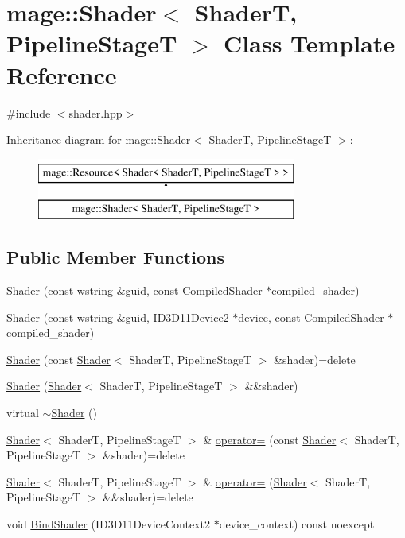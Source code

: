 \hypertarget{classmage_1_1_shader}{}\section{mage\+:\+:Shader$<$ ShaderT, Pipeline\+StageT $>$ Class Template Reference}
\label{classmage_1_1_shader}


{\ttfamily \#include $<$shader.\+hpp$>$}

Inheritance diagram for mage\+:\+:Shader$<$ ShaderT, Pipeline\+StageT $>$\+:\begin{figure}[H]
\begin{center}
\leavevmode
\includegraphics[height=2.000000cm]{classmage_1_1_shader}
\end{center}
\end{figure}
\subsection*{Public Member Functions}
\begin{DoxyCompactItemize}
\item 
\hyperlink{classmage_1_1_shader_a4f02b0d895bd5aafbc72835f0f005c67}{Shader} (const wstring \&guid, const \hyperlink{structmage_1_1_compiled_shader}{Compiled\+Shader} $\ast$compiled\+\_\+shader)
\item 
\hyperlink{classmage_1_1_shader_a5fe620f476f956d5d56e9567493d398a}{Shader} (const wstring \&guid, I\+D3\+D11\+Device2 $\ast$device, const \hyperlink{structmage_1_1_compiled_shader}{Compiled\+Shader} $\ast$compiled\+\_\+shader)
\item 
\hyperlink{classmage_1_1_shader_a512a10b41172e984d8f6983497bcc9e5}{Shader} (const \hyperlink{classmage_1_1_shader}{Shader}$<$ ShaderT, Pipeline\+StageT $>$ \&shader)=delete
\item 
\hyperlink{classmage_1_1_shader_a9d87b88ded8e6874d061cb8c54d6a5e9}{Shader} (\hyperlink{classmage_1_1_shader}{Shader}$<$ ShaderT, Pipeline\+StageT $>$ \&\&shader)
\item 
virtual \hyperlink{classmage_1_1_shader_a10a954f75331d93c9549b2db5a2c838e}{$\sim$\+Shader} ()
\item 
\hyperlink{classmage_1_1_shader}{Shader}$<$ ShaderT, Pipeline\+StageT $>$ \& \hyperlink{classmage_1_1_shader_a235c45ff470f15367cc7381da0f01130}{operator=} (const \hyperlink{classmage_1_1_shader}{Shader}$<$ ShaderT, Pipeline\+StageT $>$ \&shader)=delete
\item 
\hyperlink{classmage_1_1_shader}{Shader}$<$ ShaderT, Pipeline\+StageT $>$ \& \hyperlink{classmage_1_1_shader_a2fa066425e397523b3ce181e5dc46c9d}{operator=} (\hyperlink{classmage_1_1_shader}{Shader}$<$ ShaderT, Pipeline\+StageT $>$ \&\&shader)=delete
\item 
void \hyperlink{classmage_1_1_shader_a64ad7404bd0fccc96debd67a4ba4beed}{Bind\+Shader} (I\+D3\+D11\+Device\+Context2 $\ast$device\+\_\+context) const noexcept
\end{DoxyCompactItemize}
